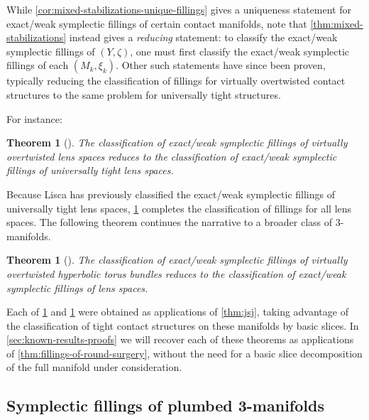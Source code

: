 \documentclass[11pt]{amsart}
\numberwithin{equation}{section}
\theoremstyle{plain}
\newtheorem{thm}[equation]{Theorem}%
\theoremstyle{definition}
\theoremstyle{remark}\newtheorem{rem}[equation]{Remark}%
\theoremstyle{remark}\newtheorem{obs}[equation]{Observation}%
\begin{document}
While \cref{cor:mixed-stabilizations-unique-fillings} gives a uniqueness statement for exact/weak symplectic fillings of certain contact manifolds, note that \cref{thm:mixed-stabilizations} instead gives a \emph{reducing} statement: to classify the exact/weak symplectic fillings of $(Y,\zeta)$, one must first classify the exact/weak symplectic fillings of each $(M_k,\xi_k)$.  Other such statements have since been proven, typically reducing the classification of fillings for virtually overtwisted contact structures to the same problem for universally tight structures.

For instance:
\begin{thm}[{\cite{etnyre2021symplectic,christian2023some}}]\label{thm:lens-space-fillings}
The classification of exact/weak symplectic fillings of virtually overtwisted lens spaces reduces to the classification of exact/weak symplectic fillings of universally tight lens spaces.
\end{thm}

Because Lisca \cite{lisca2008symplectic} has previously classified the exact/weak symplectic fillings of universally tight lens spaces, \cref{thm:lens-space-fillings} completes the classification of fillings for all lens spaces.  The following theorem continues the narrative to a broader class of 3-manifolds.

\begin{thm}[{\cite[Theorem 1.1]{christian2021symplectic}}]\label{thm:torus-bundle-vague}
The classification of exact/weak symplectic fillings of virtually overtwisted hyperbolic torus bundles reduces to the classification of exact/weak symplectic fillings of lens spaces.
\end{thm}

Each of \cref{thm:lens-space-fillings} and \cref{thm:torus-bundle-vague} were obtained as applications of \cref{thm:jsj}, taking advantage of the classification of tight contact structures on these manifolds by basic slices. In \cref{sec:known-results-proofs} we will recover each of these theorems as applications of \cref{thm:fillings-of-round-surgery}, without the need for a basic slice decomposition of the full manifold under consideration.


\subsection{Symplectic fillings of plumbed 3-manifolds}\label{subsec:intro:plumbed}
\end{document}
